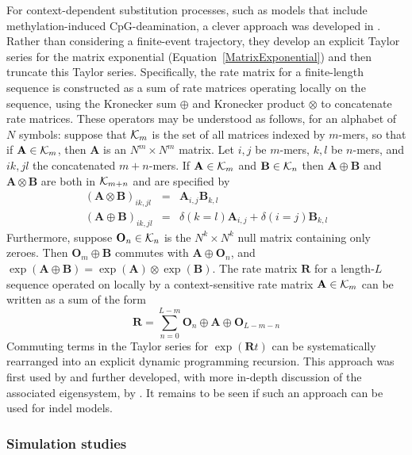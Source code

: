 \documentclass{bmcart}
\newcommand{\matr}[1]{\mathbf{#1}}
\newcommand{\eqref}[1]{Equation~\ref{#1}}
\newcommand{\ratematrix}{\matr{R}}
\begin{document}
For context-dependent substitution processes,
such as models that include methylation-induced CpG-deamination,
a clever approach was developed in \cite{LunterHein04}.
Rather than considering a finite-event trajectory, they develop an explicit Taylor series for the matrix exponential
(\eqref{MatrixExponential}) and then truncate this Taylor series.
\color{red}
Specifically, the rate matrix for a finite-length sequence is constructed
as a sum of rate matrices operating locally on the sequence, using the Kronecker sum $\oplus$
and Kronecker product $\otimes$ to concatenate rate matrices.
These operators may be understood as follows, for an alphabet of $N$ symbols:
suppose that ${\cal K}_m$ is the set of all matrices indexed by $m$-mers,
so that if $\matr{A} \in {\cal K}_m$, then $\matr{A}$ is an $N^m \times N^m$ matrix.
Let $i,j$ be $m$-mers, $k,l$ be $n$-mers, and $ik, jl$ the concatenated $m+n$-mers.
If $\matr{A} \in {\cal K}_m$ and $\matr{B} \in {\cal K}_n$
then $\matr{A} \oplus \matr{B}$ and $\matr{A} \otimes \matr{B}$ are both in ${\cal K}_{m+n}$
and are specified by
\begin{eqnarray}
  \left( \matr{A} \otimes \matr{B} \right)_{ik,jl} & = & \matr{A}_{i,j} \matr{B}_{k,l} \\
  \left( \matr{A} \oplus \matr{B} \right)_{ik,jl} & = & \delta(k=l) \matr{A}_{i,j} + \delta(i=j) \matr{B}_{k,l}
\end{eqnarray}
Furthermore, suppose $\matr{O}_n \in {\cal K}_n$ is the $N^k \times N^k$ null matrix containing only zeroes.
Then $\matr{O}_m \oplus \matr{B}$ commutes with $\matr{A} \oplus \matr{O}_n$,
and $\exp(\matr{A} \oplus \matr{B}) = \exp(\matr{A}) \otimes \exp(\matr{B})$.
The rate matrix $\ratematrix$ for a length-$L$ sequence operated on locally by a context-sensitive rate matrix $\matr{A} \in {\cal K}_m$ can be written as a sum of the form
\[
\ratematrix = \sum_{n=0}^{L-m} \matr{O}_n \oplus \matr{A} \oplus \matr{O}_{L-m-n}
\]
Commuting terms in the Taylor series for $\exp(\ratematrix t)$ can be systematically rearranged into an explicit dynamic programming recursion.
This approach was first used by \cite{LunterHein04} and further developed, with more in-depth discussion of the associated eigensystem, by \cite{pmid21827770,pmid26135206}.
\color{black}
It remains to be seen if such an approach can be used for indel models.

\subsubsection*{Simulation studies}
\end{document}
